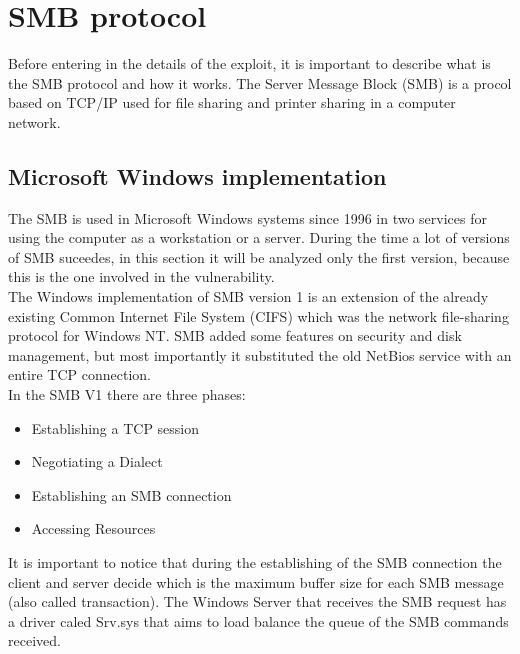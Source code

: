 \section{SMB protocol}
Before entering in the details of the exploit, it is important to describe what is the SMB 
protocol and how it works.
The Server Message Block (SMB) is a procol based on TCP/IP used for file sharing and printer sharing 
in a computer network.

\subsection{Microsoft Windows implementation}
The SMB is used in Microsoft Windows systems since 1996 in two services for using the computer as a 
workstation or a server.
During the time a lot of versions of SMB suceedes, in this section it will be analyzed only the first version, because
this is the one involved in the vulnerability.\\
The Windows implementation of SMB version 1 is an extension of the already existing Common Internet File System (CIFS)
which was the network file-sharing protocol for Windows NT.
SMB added some features on security and disk management, but most importantly it substituted the old NetBios service with an entire 
TCP connection.\\
In the SMB V1 there are three phases\cite{microsoft-smb}:
\begin{itemize}
    \item Establishing a TCP session
    \item Negotiating a Dialect
    \item Establishing an SMB connection
    \item Accessing Resources
\end{itemize}
It is important to notice that during the establishing of the SMB connection the client and server decide which is the maximum
buffer size for each SMB message (also called transaction).
The Windows Server that receives the SMB request has a driver caled Srv.sys that aims to load balance the queue of the SMB commands received.

